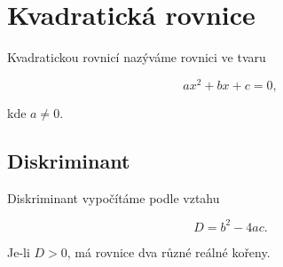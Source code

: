 \section{Kvadratická rovnice}

Kvadratickou rovnicí nazýváme rovnici ve tvaru

\[
ax^2 + bx + c = 0,
\]

kde \(a \neq 0\).

\subsection{Diskriminant}

Diskriminant vypočítáme podle vztahu

\[
D = b^2 - 4ac.
\]

Je-li \(D > 0\), má rovnice dva různé reálné kořeny.